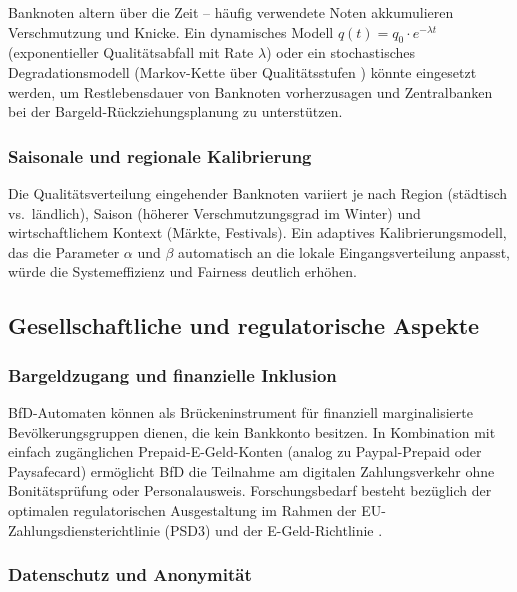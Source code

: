 ﻿\documentclass[a4paper,12pt]{article}
\theoremstyle{definition}
\begin{document}
Banknoten altern über die Zeit -- häufig verwendete Noten akkumulieren
Verschmutzung und Knicke.  Ein dynamisches Modell
$q(t) = q_0 \cdot e^{-\lambda t}$ (exponentieller Qualitätsabfall mit Rate $\lambda$)
oder ein stochastisches Degradationsmodell (Markov-Kette über Qualitätsstufen \cite{ross2014introduction})
könnte eingesetzt werden, um Restlebensdauer von Banknoten vorherzusagen
und Zentralbanken bei der Bargeld-Rückziehungsplanung zu unterstützen.

\subsubsection{Saisonale und regionale Kalibrierung}

Die Qualitätsverteilung eingehender Banknoten variiert je nach Region
(städtisch vs.\ ländlich), Saison (höherer Verschmutzungsgrad im Winter)
und wirtschaftlichem Kontext (Märkte, Festivals).
Ein adaptives Kalibrierungsmodell, das die Parameter $\alpha$ und $\beta$
automatisch an die lokale Eingangsverteilung anpasst, würde die Systemeffizienz
und Fairness deutlich erhöhen.

\subsection{Gesellschaftliche und regulatorische Aspekte}

\subsubsection{Bargeldzugang und finanzielle Inklusion}

BfD-Automaten können als Brückeninstrument für finanziell marginalisierte
Bevölkerungsgruppen dienen, die kein Bankkonto besitzen.
In Kombination mit einfach zugänglichen Prepaid-E-Geld-Konten
(analog zu Paypal-Prepaid oder Paysafecard) ermöglicht BfD die Teilnahme
am digitalen Zahlungsverkehr ohne Bonitätsprüfung oder Personalausweis.
Forschungsbedarf besteht bezüglich der optimalen regulatorischen Ausgestaltung
im Rahmen der EU-Zahlungsdiensterichtlinie (PSD3) und der E-Geld-Richtlinie \cite{eu2009emoney}.

\subsubsection{Datenschutz und Anonymität}
\end{document}
